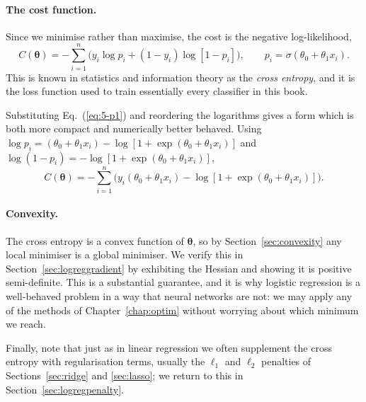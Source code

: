 \paragraph{The cost function.}
Since we minimise rather than maximise, the cost is the negative
log-likelihood,
\begin{equation}
  \boxed{\;
  C(\bm{\theta}) = -\sum_{i=1}^{n}\Big(
    y_i\log p_i + (1-y_i)\log\left[1-p_i\right]\Big),
  \qquad p_i = \sigma(\theta_0+\theta_1x_i) . \;}
  \label{eq:5-crossentropy}
\end{equation}
This is known in statistics and information theory as the \emph{cross
entropy}, and it is the loss function used to train essentially every
classifier in this book.

Substituting Eq.~(\ref{eq:5-p1}) and reordering the logarithms gives a form
which is both more compact and numerically better behaved.  Using
$\log p_i = (\theta_0+\theta_1x_i)-\log[1+\exp(\theta_0+\theta_1x_i)]$ and
$\log(1-p_i)=-\log[1+\exp(\theta_0+\theta_1x_i)]$,
\begin{equation}
  C(\bm{\theta}) = -\sum_{i=1}^{n}
    \Big(y_i(\theta_0+\theta_1x_i)
      - \log\left[1+\exp(\theta_0+\theta_1x_i)\right]\Big).
  \label{eq:5-crossentropycompact}
\end{equation}

\paragraph{Convexity.}
The cross entropy is a convex function of $\bm{\theta}$, so by
Section~\ref{sec:convexity} any local minimiser is a global minimiser.  We
verify this in Section~\ref{sec:logreggradient} by exhibiting the Hessian and
showing it is positive semi-definite.  This is a substantial guarantee, and it
is why logistic regression is a well-behaved problem in a way that neural
networks are not: we may apply any of the methods of
Chapter~\ref{chap:optim} without worrying about which minimum we reach.

Finally, note that just as in linear regression we often supplement the cross
entropy with regularisation terms, usually the $\ell_1$ and $\ell_2$ penalties
of Sections~\ref{sec:ridge} and \ref{sec:lasso}; we return to this in
Section~\ref{sec:logregpenalty}.

